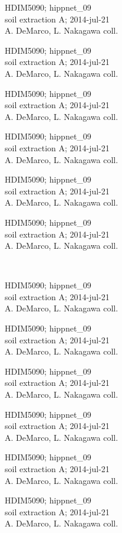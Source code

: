 \documentclass[2pt]{extarticle}
\begin{document}
\noindent
\parbox{0.16\textwidth}{\tiny \raggedright \rule[-0.3\baselineskip]{0pt}{10pt}HDIM5090; hippnet\_09\\ soil extraction A; 2014-jul-21\\ A. DeMarco, L. Nakagawa coll.}
\parbox{0.16\textwidth}{\tiny \raggedright \rule[-0.3\baselineskip]{0pt}{10pt}HDIM5090; hippnet\_09\\ soil extraction A; 2014-jul-21\\ A. DeMarco, L. Nakagawa coll.}
\parbox{0.16\textwidth}{\tiny \raggedright \rule[-0.3\baselineskip]{0pt}{10pt}HDIM5090; hippnet\_09\\ soil extraction A; 2014-jul-21\\ A. DeMarco, L. Nakagawa coll.}
\parbox{0.16\textwidth}{\tiny \raggedright \rule[-0.3\baselineskip]{0pt}{10pt}HDIM5090; hippnet\_09\\ soil extraction A; 2014-jul-21\\ A. DeMarco, L. Nakagawa coll.}
\parbox{0.16\textwidth}{\tiny \raggedright \rule[-0.3\baselineskip]{0pt}{10pt}HDIM5090; hippnet\_09\\ soil extraction A; 2014-jul-21\\ A. DeMarco, L. Nakagawa coll.}
\parbox{0.16\textwidth}{\tiny \raggedright \rule[-0.3\baselineskip]{0pt}{10pt}HDIM5090; hippnet\_09\\ soil extraction A; 2014-jul-21\\ A. DeMarco, L. Nakagawa coll.} \\ 
\vspace{0.001in} 

\noindent
\parbox{0.16\textwidth}{\tiny \raggedright \rule[-0.3\baselineskip]{0pt}{10pt}HDIM5090; hippnet\_09\\ soil extraction A; 2014-jul-21\\ A. DeMarco, L. Nakagawa coll.}
\parbox{0.16\textwidth}{\tiny \raggedright \rule[-0.3\baselineskip]{0pt}{10pt}HDIM5090; hippnet\_09\\ soil extraction A; 2014-jul-21\\ A. DeMarco, L. Nakagawa coll.}
\parbox{0.16\textwidth}{\tiny \raggedright \rule[-0.3\baselineskip]{0pt}{10pt}HDIM5090; hippnet\_09\\ soil extraction A; 2014-jul-21\\ A. DeMarco, L. Nakagawa coll.}
\parbox{0.16\textwidth}{\tiny \raggedright \rule[-0.3\baselineskip]{0pt}{10pt}HDIM5090; hippnet\_09\\ soil extraction A; 2014-jul-21\\ A. DeMarco, L. Nakagawa coll.}
\parbox{0.16\textwidth}{\tiny \raggedright \rule[-0.3\baselineskip]{0pt}{10pt}HDIM5090; hippnet\_09\\ soil extraction A; 2014-jul-21\\ A. DeMarco, L. Nakagawa coll.}
\parbox{0.16\textwidth}{\tiny \raggedright \rule[-0.3\baselineskip]{0pt}{10pt}HDIM5090; hippnet\_09\\ soil extraction A; 2014-jul-21\\ A. DeMarco, L. Nakagawa coll.} \\ 
\vspace{0.001in} 
\end{document}

